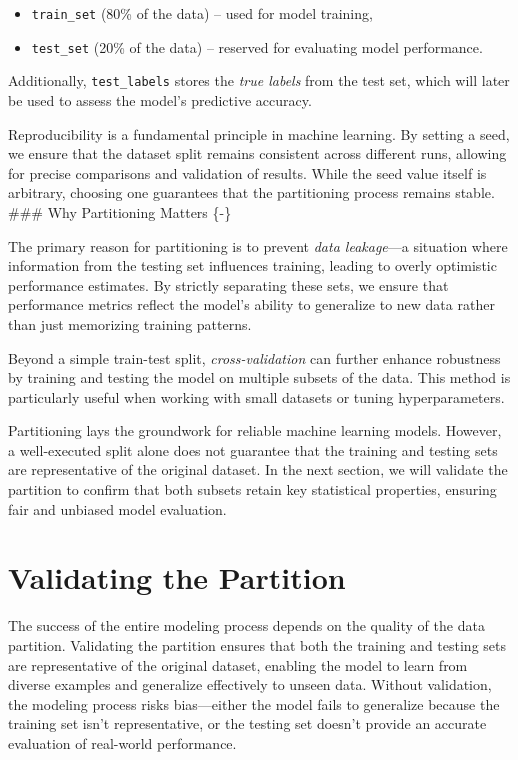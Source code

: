\documentclass[
  11pt,
]{book}
\providecommand{\tightlist}{%
  \setlength{\itemsep}{0pt}\setlength{\parskip}{0pt}}
\theoremstyle{definition}
\theoremstyle{definition}
\theoremstyle{definition}
\theoremstyle{definition}
\theoremstyle{remark}
\begin{document}
\begin{itemize}
\tightlist
\item
  \texttt{train\_set} (80\% of the data) -- used for model training,\\
\item
  \texttt{test\_set} (20\% of the data) -- reserved for evaluating model performance.
\end{itemize}

Additionally, \texttt{test\_labels} stores the \emph{true labels} from the test set, which will later be used to assess the model's predictive accuracy.

Reproducibility is a fundamental principle in machine learning. By setting a seed, we ensure that the dataset split remains consistent across different runs, allowing for precise comparisons and validation of results. While the seed value itself is arbitrary, choosing one guarantees that the partitioning process remains stable.\\
\#\#\# Why Partitioning Matters \{-\}

The primary reason for partitioning is to prevent \emph{data leakage}---a situation where information from the testing set influences training, leading to overly optimistic performance estimates. By strictly separating these sets, we ensure that performance metrics reflect the model's ability to generalize to new data rather than just memorizing training patterns.

Beyond a simple train-test split, \emph{cross-validation} can further enhance robustness by training and testing the model on multiple subsets of the data. This method is particularly useful when working with small datasets or tuning hyperparameters.

Partitioning lays the groundwork for reliable machine learning models. However, a well-executed split alone does not guarantee that the training and testing sets are representative of the original dataset. In the next section, we will validate the partition to confirm that both subsets retain key statistical properties, ensuring fair and unbiased model evaluation.

\section{Validating the Partition}\label{sec-validate-partition}

The success of the entire modeling process depends on the quality of the data partition. Validating the partition ensures that both the training and testing sets are representative of the original dataset, enabling the model to learn from diverse examples and generalize effectively to unseen data. Without validation, the modeling process risks bias---either the model fails to generalize because the training set isn't representative, or the testing set doesn't provide an accurate evaluation of real-world performance.
\end{document}
